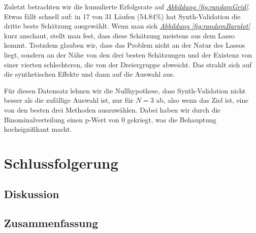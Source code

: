 \documentclass[12pt,a4paper,twoside]{scrartcl}
\numberwithin{equation}{section}
\newcommand{\reffig}[1]{\emph{\hyperref[#1]{Abbildung \ref*{#1}}}}
\newcounter{mypagecount}%
\newenvironment{interlude}{%
  \clearpage
  \setcounter{mypagecount}{\value{page}}%
  \thispagestyle{empty}%
  \pagestyle{empty}%
}{%
  \clearpage
  \setcounter{page}{\value{mypagecount}}%
}
\begin{document}
\noindent
Zuletzt betrachten wir die kumulierte Erfolgsrate auf \reffig{fig:randomGrid}. Etwas fällt schnell auf: in 17 von 31 Läufen (54.84\%) hat Synth-Validation die dritte beste Schätzung ausgewählt. Wenn man sich \reffig{fig:randomBarplot} kurz anschaut, stellt man fest, dass diese Schätzung meistens aus dem Lasso kommt. Trotzdem glauben wir, dass das Problem nicht an der Natur des Lassos liegt, sondern an der Nähe von den drei besten Schätzungen und der Existenz von einer vierten schlechteren, die von der Dreiergruppe abweicht. Das strahlt sich auf die synthetischen Effekte und dann auf die Auswahl aus.\par

\noindent
Für diesen Datensatz lehnen wir die Nullhypothese, dass Synth-Validation nicht besser als die zufällige Auswahl ist, nur für $N=3$ ab, also wenn das Ziel ist, eine von den besten drei Methoden auszuwählen. Dabei haben wir durch die Binominalverteilung einen p-Wert von 0 gekriegt, was die Behauptung hochsignifikant macht.\par

\clearpage

\section{Schlussfolgerung}\label{sec:schlussfolgerung}
	\subsection{Diskussion}\label{subsec:diskussion}
  	\subsection{Zusammenfassung}\label{subsec:zusammenfassung}
\clearpage
	

\begin{interlude}
  
  \begin{appendices}
  \label{anhang}
   
  \end{appendices}
  \clearpage
  
  
\end{interlude}
\end{document}
